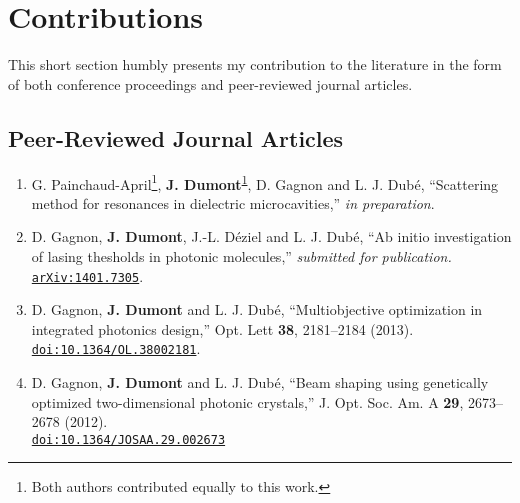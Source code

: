 \chapter*{Contributions}
This short section humbly presents my contribution to the 
literature in the form of both conference proceedings and 
peer-reviewed journal articles. 

\section*{Peer-Reviewed Journal Articles}
\renewcommand*{\thefootnote}{\fnsymbol{footnote}}

\begin{enumerate}
 \item G. Painchaud-April\footnote{\label{note1}Both authors contributed equally to this work.}, 
	\textbf{J. Dumont}\textsuperscript{\ref{note1}}, D. Gagnon and L. J. Dubé, 
	``Scattering method for resonances in dielectric microcavities,'' \textit{in preparation}.
  \item D. Gagnon, \textbf{J. Dumont}, J.-L. Déziel and L. J. Dubé, 
	``Ab initio investigation of lasing thesholds in photonic molecules,'' \textit{submitted for publication.}
	\href{http://arxiv.og/abs/1401.7305}{\texttt{arXiv:1401.7305}}.
  \item D. Gagnon, \textbf{J. Dumont} and L. J. Dubé, 
	``Multiobjective optimization in integrated photonics design,''
	Opt. Lett \textbf{38}, 2181--2184 (2013). 
	\href{http://dx.doi.org/10.1364/OL.38002181}{\texttt{doi:10.1364/OL.38002181}}.
  \item D. Gagnon, \textbf{J. Dumont} and L. J. Dubé, 
	``Beam shaping using genetically optimized two-dimensional photonic crystals,''
	J. Opt. Soc. Am. A \textbf{29}, 2673--2678 (2012). 
	\\\href{http://dx.doi.org/10.1364/JOSAA.29.002673}{\texttt{doi:10.1364/JOSAA.29.002673}}
\end{enumerate}

